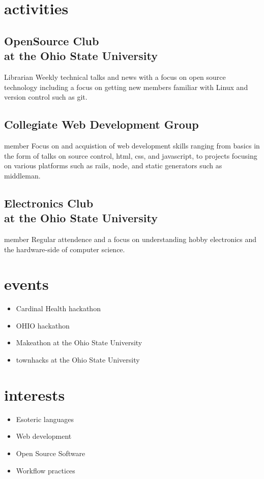 \documentclass[letterpaper,6pt]{cv}
\begin{document}
	\section{activities}

	\subsection{OpenSource Club\\ at the Ohio State University}{Librarian}{}
			Weekly technical talks and news with a focus on open source technology including a focus on getting new members familiar with Linux and version control such as git.

			\subsection{Collegiate Web Development Group}{member}{}
			Focus on and acquistion of web development skills ranging from basics in the form of talks on source control, html, css, and javascript, to projects focusing on various platforms such as rails, node, and static generators such as middleman.

			\subsection{Electronics Club\\ at the Ohio State University}{member}{}
			Regular attendence and a focus on understanding hobby electronics and the hardware-side of computer science.

	\section{events}
		\begin{itemize}
			\item Cardinal Health hackathon
			\item OHIO hackathon
			\item Makeathon at the Ohio State University
			\item townhacks at the Ohio State University
		\end{itemize}

	\section{interests}
		\begin{itemize}
			\item Esoteric languages
			\item Web development
			\item Open Source Software
			\item Workflow practices
		\end{itemize}
		
\end{document}
